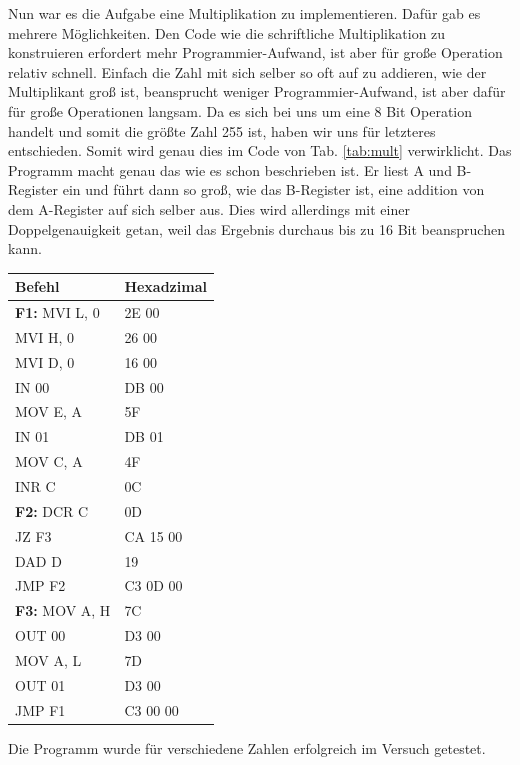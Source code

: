 \documentclass[10pt]{article}
\begin{document}
\begin{multicols}{2}
  Nun war es die Aufgabe eine Multiplikation zu implementieren. Dafür gab es mehrere Möglichkeiten. Den Code wie die schriftliche Multiplikation zu konstruieren erfordert mehr Programmier-Aufwand, ist aber für große Operation relativ schnell. Einfach die Zahl mit sich selber so oft auf zu addieren, wie der Multiplikant groß ist, beansprucht weniger Programmier-Aufwand, ist aber dafür für große Operationen langsam. Da es sich bei uns um eine 8 Bit Operation handelt und somit die größte Zahl 255 ist, haben wir uns für letzteres entschieden. Somit wird genau dies im Code von Tab. \ref{tab:mult} verwirklicht. Das Programm macht genau das wie es schon beschrieben ist. Er liest A und B-Register ein und führt dann so groß, wie das B-Register ist, eine addition von dem A-Register auf sich selber aus. Dies wird allerdings mit einer Doppelgenauigkeit getan, weil das Ergebnis durchaus bis zu 16 Bit beanspruchen kann.
	\begin{center}
		\begin{tabular}{|l|l|}
			\hline
			\textbf{Befehl}        & \textbf{Hexadzimal} \\
			\hline
			\textbf{F1:} MVI L, 0 & 2E 00               \\
			MVI H, 0              & 26 00               \\
			MVI D, 0              & 16 00               \\
			IN 00                  & DB 00               \\
			MOV E, A               & 5F                  \\
			IN 01                  & DB 01               \\
			MOV C, A               & 4F                  \\
			INR C                  & 0C                  \\
			\textbf{F2:} DCR C     & 0D                  \\
			JZ F3                  & CA 15 00            \\
			DAD D                  & 19                  \\
			JMP F2                 & C3 0D 00            \\
			\textbf{F3:} MOV A, H  & 7C                  \\
			OUT 00                 & D3 00               \\
			MOV A, L               & 7D                  \\
			OUT 01                 & D3 00               \\
			JMP F1                 & C3 00 00            \\
			\hline
		\end{tabular}
    \label{tab:mult}
	\end{center}
  Die Programm wurde für verschiedene Zahlen erfolgreich im Versuch getestet.


\end{multicols}
\end{document}
